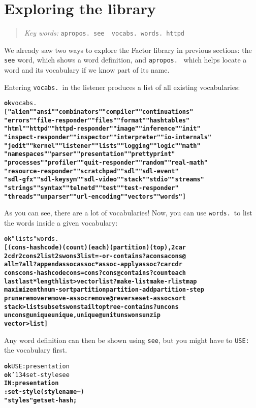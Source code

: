 \documentclass[english]{book}
\newcommand{\ttbackslash}{\char'134}
\newcommand{\chapkeywords}[1]{%
\begin{quote}
\emph{Key words:} \texttt{#1}
\end{quote}
}
\begin{document}
\section{Exploring the library}

\chapkeywords{apropos. see ~vocabs.~words.~httpd}

We already saw two ways to explore the Factor library in previous sections: the \texttt{see} word, which shows a word definition, and \texttt{apropos.}~ which helps locate a word and its vocabulary if we know part of its name.

Entering \texttt{vocabs.}~in the listener produces a list of all existing vocabularies:

\begin{alltt}
\textbf{ok} vocabs.
\textbf{[ "alien" "ansi" "combinators" "compiler" "continuations"
"errors" "file-responder" "files" "format" "hashtables"
"html" "httpd" "httpd-responder" "image" "inference" "init"
"inspect-responder" "inspector" "interpreter" "io-internals"
"jedit" "kernel" "listener" "lists" "logging" "logic" "math"
"namespaces" "parser" "presentation" "prettyprint"
"processes" "profiler" "quit-responder" "random" "real-math"
"resource-responder" "scratchpad" "sdl" "sdl-event"
"sdl-gfx" "sdl-keysym" "sdl-video" "stack" "stdio" "streams"
"strings" "syntax" "telnetd" "test" "test-responder"
"threads" "unparser" "url-encoding" "vectors" "words" ]
}
\end{alltt}

As you can see, there are a lot of vocabularies! Now, you can use \texttt{words.}~to list the words inside a given vocabulary:

\begin{alltt}
\textbf{ok} "lists" words.
\textbf{[ (cons-hashcode) (count) (each) (partition) (top) , 2car
2cdr 2cons 2list 2swons 3list =-or-contains? acons acons@
all=? all? append assoc assoc* assoc-apply assoc? car cdr
cons cons-hashcode cons= cons? cons@ contains? count each
last last* length list>vector list? make-list make-rlist map
maximize nth num-sort partition partition-add partition-step
prune remove remove-assoc remove@ reverse set-assoc sort
stack>list subset swons tail top tree-contains? uncons
uncons@ unique unique, unique@ unit unswons unzip
vector>list ]}
\end{alltt}

Any word definition can then be shown using \texttt{see}, but you might have to \texttt{USE:} the vocabulary first.

\begin{alltt}
\textbf{ok} USE: presentation
\textbf{ok} \ttbackslash set-style see
\textbf{IN: presentation
: set-style ( style name -- )
    "styles" get set-hash ;}
\end{alltt}
\end{document}
